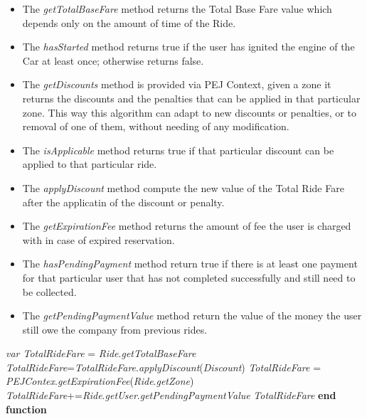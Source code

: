 \begin{itemize}
    \item The \textit{getTotalBaseFare} method returns the Total Base Fare value which depends only on the amount of time of the Ride.
    \item The \textit{hasStarted} method returns true if the user has ignited the engine of the Car at least once; otherwise returns false.
    \item The \textit{getDiscounts} method is provided via PEJ Context, given a zone it returns the discounts and the penalties that can be applied in that particular zone.\newline
    This way this algorithm can adapt to new discounts or penalties, or to removal of one of them, without needing of any modification.
    \item The \textit{isApplicable} method returns true if that particular discount can be applied to that particular ride.
    \item The \textit{applyDiscount} method compute the new value of the Total Ride Fare after the applicatin of the discount or penalty.
    \item The \textit{getExpirationFee} method returns the amount of fee the user is charged with in case of expired reservation.
    \item The \textit{hasPendingPayment} method return true if there is at least one payment for that particular user that has not completed successfully and still need to be collected.
     \item The \textit{getPendingPaymentValue} method return the value of the money the user still owe the company from previous rides.
\end{itemize}

\begin{algorithm}
\caption{}\label{euclid}
\begin{algorithmic}[1]
\State \textit{var TotalRideFare} = \textit{Ride}.\textit{getTotalBaseFare}
\State \textit{TotalRideFare}=\textit{TotalRideFare}.\textit{applyDiscount}(\textit{Discount})
\EndIf
\EndFor
\Else
\State \textit{TotalRideFare} = \textit{PEJContex}.\textit{getExpirationFee}(\textit{Ride}.\textit{getZone})
\EndIf
{}
\State \textit{TotalRideFare}+=\textit{Ride}.\textit{getUser}.\textit{getPendingPaymentValue}
\EndIf
\State \Return \textit{TotalRideFare}
\EndFunction
\State \textbf{end function}
\end{algorithmic}
\end{algorithm}

\leavevmode\thispagestyle{empty}\newpage